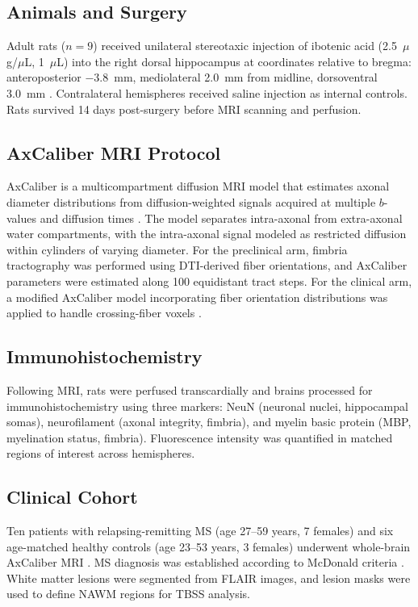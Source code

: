 \documentclass[11pt]{article}
\begin{document}
\subsection{Animals and Surgery}

Adult rats ($n = 9$) received unilateral stereotaxic injection of ibotenic acid (2.5~$\mu$g/$\mu$L, 1~$\mu$L) into the right dorsal hippocampus at coordinates relative to bregma: anteroposterior $-3.8$~mm, mediolateral 2.0~mm from midline, dorsoventral 3.0~mm \citep{paxinos2007rat}. Contralateral hemispheres received saline injection as internal controls. Rats survived 14 days post-surgery before MRI scanning and perfusion.

\subsection{AxCaliber MRI Protocol}

AxCaliber is a multicompartment diffusion MRI model that estimates axonal diameter distributions from diffusion-weighted signals acquired at multiple $b$-values and diffusion times \citep{assaf2008axcaliber}. The model separates intra-axonal from extra-axonal water compartments, with the intra-axonal signal modeled as restricted diffusion within cylinders of varying diameter. For the preclinical arm, fimbria tractography was performed using DTI-derived fiber orientations, and AxCaliber parameters were estimated along 100 equidistant tract steps. For the clinical arm, a modified AxCaliber model incorporating fiber orientation distributions was applied to handle crossing-fiber voxels \citep{stikov2015vivo}.

\subsection{Immunohistochemistry}

Following MRI, rats were perfused transcardially and brains processed for immunohistochemistry using three markers: NeuN (neuronal nuclei, hippocampal somas), neurofilament (axonal integrity, fimbria), and myelin basic protein (MBP, myelination status, fimbria). Fluorescence intensity was quantified in matched regions of interest across hemispheres.

\subsection{Clinical Cohort}

Ten patients with relapsing-remitting MS (age 27--59 years, 7 females) and six age-matched healthy controls (age 23--53 years, 3 females) underwent whole-brain AxCaliber MRI \citep{lublin1996defining}. MS diagnosis was established according to McDonald criteria \citep{thompson2018diagnosis}. White matter lesions were segmented from FLAIR images, and lesion masks were used to define NAWM regions for TBSS analysis.
\end{document}
